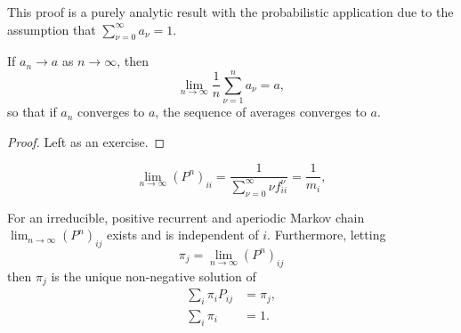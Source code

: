 \documentclass[12pt]{article}
\begin{document}
\begin{remark}
    This proof is a purely analytic result with the probabilistic
    application due to the assumption that \( \sum_{\nu=0}^{\infty} a_\nu
    = 1 \).
\end{remark}

\begin{lemma}
    If \( a_n \to a \) as \( n \to \infty \), then
    \[
        \lim_{n \to \infty} \frac{1}{n} \sum\limits_{\nu=1}^{n} a_{\nu}
        = a,
    \] so that if \( a_n \) converges to \( a \), the sequence of
    averages converges to \( a \).
\end{lemma}

\begin{proof}
    Left as an exercise.
\end{proof}

\begin{corollary}
    \[
        \lim_{n \to \infty} (P^{n})_{ii} = \frac{1}{\sum\limits_{\nu=0}^
        {\infty} \nu f^{\nu}_{ii}} = \frac{1}{m_i},
    \]
\end{corollary}

\begin{theorem}
    For an irreducible, positive recurrent and aperiodic Markov chain \(
    \lim_{n \to \infty} (P^n)_{ij} \) exists and is independent of \( i \).
    Furthermore, letting
    \[
        \pi_j = \lim_{n \to \infty} (P^n)_{ij}
    \] then \( \pi_j \) is the unique non-negative solution of
    \begin{align}
        \sum\limits_{i} \pi_{i} P_{ij} &= \pi_{j},%
        \label{eq:stationarydistributions:FTMC1}\\
        \sum\limits_{i} \pi_{i} &= 1.%
        \label{eq:stationarydistributions:FTMC2}
    \end{align}
\end{theorem}
\end{document}
